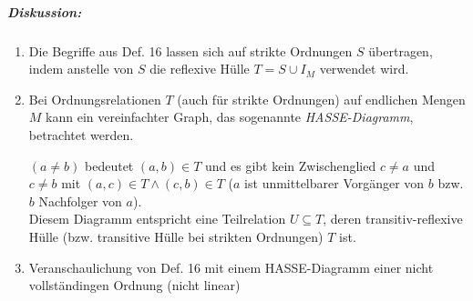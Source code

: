\subparagraph{Diskussion:} 
\begin{enumerate}
\item Die Begriffe aus Def. 16 lassen sich auf strikte Ordnungen $S$ übertragen, indem anstelle von $S$ die reflexive Hülle $T=S \cup I_M$ verwendet wird.
\item Bei Ordnungsrelationen $T$ (auch für strikte Ordnungen) auf endlichen Mengen $M$ kann ein vereinfachter Graph, das sogenannte \emph{HASSE-Diagramm}, betrachtet werden.\\
$(a\not = b)$ bedeutet $(a,b) \in T$ und es gibt kein Zwischenglied $c \not = a$ und $c\not = b$ mit $(a,c) \in T \wedge (c,b) \in T$ ($a$ ist unmittelbarer Vorgänger von $b$ bzw. $b$ Nachfolger von $a$).\\
Diesem Diagramm entspricht eine Teilrelation $U \subseteq T$, deren transitiv-reflexive Hülle (bzw. transitive Hülle bei strikten Ordnungen) $T$ ist.
\item Veranschaulichung von Def. 16 mit einem HASSE-Diagramm einer nicht vollständingen Ordnung (nicht linear)\\
\end{enumerate}
